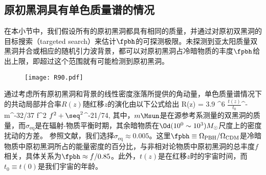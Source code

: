 \subsection{\label{mono}原初黑洞具有单色质量谱的情况}
在本小节中，我们假设所有的原初黑洞都具有相同的质量，并通过对原初双黑洞的目标搜索（targeted search）来估计$\fpbh$的可探测极限。未探测到亚太阳质量双黑洞并合或相应的随机引力波背景，都可以对原初黑洞占冷暗物质的丰度$\fpbh$给出上限，即超过这个范围就有可能检测到原初黑洞。

\begin{figure}[h]
    \centering
    \texttt{[image: R90.pdf]}
\end{figure}

通过考虑所有原初黑洞和背景的线性密度涨落所提供的角动量，单色质量谱情况下的共动局部并合率$R(z)$随红移$z$的演化由以下公式给出\cite{Ali-Haimoud:2017rtz,Chen:2018czv}
\e\label{mono_R} 
R(z) = 3.9 ^6 \times \({\frac{t(z)}{t_0}}\)^{-}
m^{-32/37} f^2 \(f^2 + \seq^2\)^{-21/74},
\q 
其中，$m \Msun$是在源参考系测量的双黑洞的质量，而$\sigma_{\mathrm{eq}}$是在辐射-物质平衡时期，其余暗物质在$\Od(10^0\sim10^3) M_\odot$尺度上的密度扰动的方差。
参照文献\cite{Ali-Haimoud:2017rtz,Chen:2018czv}，我们选择$\sigma_{\mathrm{eq}}\approx 0.005$。这里$\fpbh \equiv \Omega_{\mathrm{PBH}}/\Omega_{\mathrm{CDM}}$是冷暗物质中原初黑洞所占的能量密度的百分比，与非相对论物质中原初黑洞的总丰度$f$相关，具体关系为$\fpbh \approx f/0.85$。此外，$t(z)$是在红移$z$时的宇宙时间，而$t_0\equiv t(0)$是我们宇宙的年龄。

